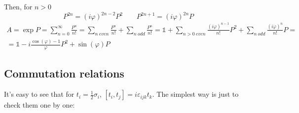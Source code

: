 \documentclass{article}
\begin{document}
Then, for $n > 0$
\begin{equation}
    P^{2n} = (i\varphi)^{2n-2} P^{2} \qquad P^{2n+1} = (i\varphi)^{2n}P
\end{equation}
\begin{equation}
\begin{gathered}
    A = \exp P = \sum_{n=0}^{\infty} \frac{P^n}{n!} =
    \sum_{n \ even}\frac{P^n}{n!} + \sum_{n \ odd}\frac{P^n}{n!} = 
    \mathbb{1} + \sum_{n > 0 \ even}\frac{(i\varphi)^{n - 1}}{n!}P^2 + \sum_{n \ odd}\frac{(i\varphi)^n}{n!}P = 
    \\
    = \mathbb{1} - i \frac{\cos(\varphi) - 1}{\varphi}P^2 + \sin(\varphi)P
\end{gathered}
\end{equation}
\subsection{Commutation relations}
It's easy to see that for $t_i = \frac{1}{2}\sigma_i$, $\left[t_i,t_j\right] = i\varepsilon_{ijk}t_k$. The simplest way is just to check them one by one:
\end{document}
